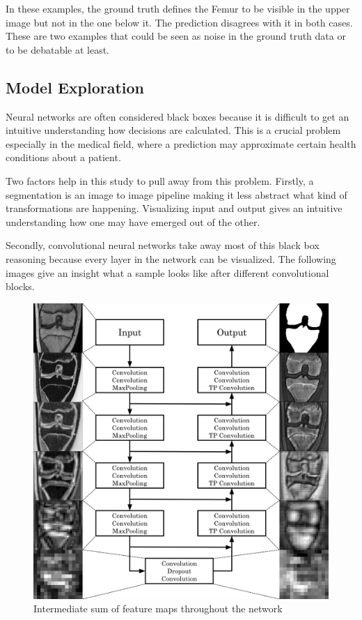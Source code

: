 In these examples, the ground truth defines the Femur to be visible in the upper image but not in the one below it. The prediction disagrees with it in both cases. These are two examples that could be seen as noise in the ground truth data or to be debatable at least.

\subsection{Model Exploration}

Neural networks are often considered black boxes because it is difficult to get an intuitive understanding how decisions are calculated. This is a crucial problem especially in the medical field, where a prediction may approximate certain health conditions about a patient.

Two factors help in this study to pull away from this problem. Firstly, a segmentation is an image to image pipeline making it less abstract what kind of transformations are happening. Visualizing input and output gives an intuitive understanding how one may have emerged out of the other.

Secondly, convolutional neural networks take away most of this black box reasoning \cite{Chollet2017} because every layer in the network can be visualized. The following images give an insight what a sample looks like after different convolutional blocks.

\begin{figure}[H]
  \centering
  \includegraphics[width=1.0\textwidth]{imgs/archi_explo.png}
\caption{Intermediate sum of feature maps throughout the network}
\end{figure}

